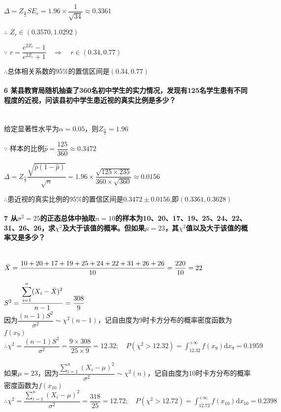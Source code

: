 \documentclass[UTF8]{ctexart}
\begin{document}
$\varDelta=Z_\frac{\alpha}{2}SE_r=1.96\times \dfrac{1}{\sqrt{34}}\approx0.3361$

$\therefore$
$Z_r\in(0.3570,1.0292)$

$\because$
$r=\dfrac{e^{2Z_r}-1}{e^{2Z_r}+1} \quad \Rightarrow \quad r\in(0.34,0.77)$

$\therefore$总体相关系数的95\%的置信区间是$(0.34,0.77)$

\paragraph{6 某县教育局随机抽查了360名初中学生的实力情况，发现有125名学生患有不同程度的近视，问该县初中学生患近视的真实比例是多少？}
~\\

给定显著性水平为$\alpha=0.05$，则$Z_\frac{\alpha}{2}=1.96$

$\because$
样本的比例$\hat{p}=\dfrac{125}{360}\approx0.3472$

$\varDelta=Z_\frac{\alpha}{2}\dfrac{\sqrt{\hat{p}(1-\hat{p})}}{\sqrt{n}}=1.96\times \dfrac{\sqrt{125\times 235}}{360\times \sqrt{360}}\approx0.0156$

$\therefore$患近视的真实比例的95\%的置信区间是$0.3472\pm0.0156$,即$(0.3361,0.3628)$


\paragraph{7 从$\sigma^2=25$的正态总体中抽取$n=10$的样本为10、20、17、19、25、24、22、31、26、26，求$\chi^2$及大于该值的概率。但如果$\mu=23$，其$\chi^2$值以及大于该值的概率又是多少？}
~\\

$\Bar{X}=\dfrac{10+20+17+19+25+24+22+31+26+26}{10}=\dfrac{220}{10}=22$

$S^2=\dfrac{\displaystyle \sum_{i=1}^n (X_i-\Bar{X})^2}{n-1}=\dfrac{308}{9}$
~\\

因为$\dfrac{(n-1)S^2}{\sigma^2} \sim \chi^2(n-1)$，记自由度为9时卡方分布的概率密度函数为$f(x_9)$
~\\

$\therefore \chi^2=\dfrac{(n-1)S^2}{\sigma^2}=\dfrac{9\times 308}{25\times 9}=12.32; 
\quad P(\chi^2>12.32)=\int_{12.32}^{+\infty}f(x_9)\mathrm{d}x_9=0.1959$
~\\

如果$\mu=23$，因为$\dfrac{\displaystyle \sum_{i=1}^n (X_i-\mu)^2}{\sigma^2} \sim \chi^2(n)$，记自由度为10时卡方分布的概率密度函数为$f(x_{10})$
~\\

$\therefore \chi^2=\dfrac{\displaystyle \sum_{i=1}^n (X_i-\mu)^2}{\sigma^2}=\dfrac{318}{25}=12.72;
\quad P(\chi^2>12.72)=\int_{12.72}^{+\infty}f(x_{10})\mathrm{d}x_{10}=0.2398$

\end{document}
